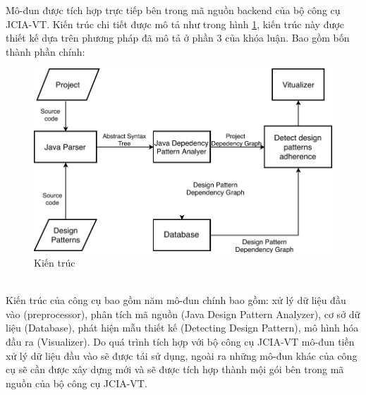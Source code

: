 \documentclass[12pt]{report}
\begin{document}
\noindent Mô-đun được tích hợp trực tiếp bên trong mã nguồn backend của bộ công cụ JCIA-VT. Kiến trúc chi tiết được mô tả như trong hình \ref{fig:detect_design_pattern_architexture}, kiến trúc này được thiết kế dựa trên phương pháp đã mô tả ở phần 3 của khóa luận. Bao gồm bốn thành phần chính:
\begin{figure}[!htbp]
	\centering
	\includegraphics[scale=0.4]{images/c4_architexture}
	\caption{Kiến trúc }
	\label{fig:detect_design_pattern_architexture}
\end{figure}\\
Kiến trúc của công cụ bao gồm năm mô-đun chính bao gồm: xử lý dữ liệu đầu vào (preprocessor), phân tích mã nguồn (Java Design Pattern Analyzer), cơ sở dữ liệu (Database), phát hiện mẫu thiết kế (Detecting Design Pattern), mô hình hóa đầu ra (Visualizer). Do quá trình tích hợp với bộ công cụ JCIA-VT mô-đun tiền xử lý dữ liệu đầu vào sẽ được tái sử dụng, ngoài ra những mô-đun khác của công cụ sẽ cần được xây dựng mới và sẽ được tích hợp thành mội gói bên trong mã nguồn của bộ công cụ  JCIA-VT.
\end{document}
